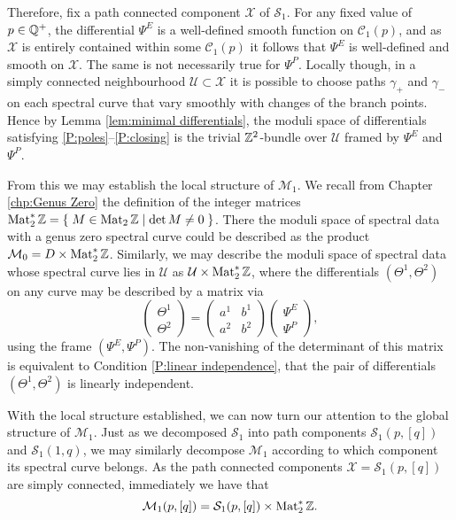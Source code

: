 Therefore, fix a path connected component $\mathcal{X}$ of $\mathcal{S}_1$. For any fixed value of $p \in \Q^+$, the differential $Ψ^E$ is a well-defined smooth function on $\mathcal{C}_1(p)$, and as $\mathcal{X}$ is entirely contained within some $\mathcal{C}_1(p)$ it follows that $Ψ^E$ is well-defined and smooth on $\mathcal{X}$. The same is not necessarily true for $Ψ^P$.
Locally though, in a simply connected neighbourhood $\mathcal{U} \subset \mathcal{X}$ it is possible to choose paths $γ_+$ and $γ_-$ on each spectral curve that vary smoothly with changes of the branch points. Hence by Lemma \ref{lem:minimal differentials}, the moduli space of differentials satisfying \ref{P:poles}--\ref{P:closing} is the trivial $\Z^2$-bundle over $\mathcal{U}$ framed by $Ψ^E$ and $Ψ^P$.

From this we may establish the local structure of $\mathcal{M}_1$.
We recall from Chapter \ref{chp:Genus Zero} the definition of the integer matrices $\Mat_2^*\Z = \Set{ M \in \Mat_2\Z }{\det M \neq 0}$. There the moduli space of spectral data with a genus zero spectral curve could be described as the product $\mathcal{M}_0 = D \times \Mat_2^*\Z$. Similarly, we may describe the moduli space of spectral data whose spectral curve lies in $\mathcal{U}$ as $\mathcal{U} \times \Mat_2^*\Z$, where the differentials $(Θ^1,Θ^2)$ on any curve may be described by a matrix via
\[
\begin{pmatrix}
Θ^1 \\ Θ^2
\end{pmatrix}
=
\begin{pmatrix}
a^1 & b^1 \\
a^2 & b^2
\end{pmatrix}
\begin{pmatrix}
Ψ^E \\ Ψ^P
\end{pmatrix},
\]
using the frame $(Ψ^E,Ψ^P)$. The non-vanishing of the determinant of this matrix is equivalent to Condition \ref{P:linear independence}, that the pair of differentials $(Θ^1,Θ^2)$ is linearly independent.

With the local structure established, we can now turn our attention to the global structure of $\mathcal{M}_1$. Just as we decomposed $\mathcal{S}_1$ into path components $\mathcal{S_1}(p,[q])$ and $\mathcal{S}_1(1,q)$, we may similarly decompose $\mathcal{M}_1$ according to which component its spectral curve belongs. As the path connected components $\mathcal{X} = \mathcal{S}_1(p,[q])$ are simply connected, immediately we have that
\[
\mathcal{M}_1(p, [q]) = \mathcal{S}_1(p,[q]) \times \Mat_2^*\Z.
\]

